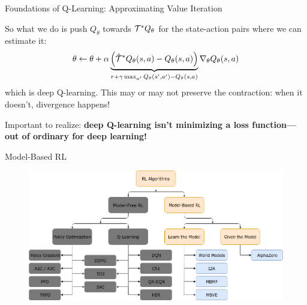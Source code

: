 \documentclass[9pt]{beamer}
\begin{document}
\begin{frame}{Foundations of Q-Learning: Approximating Value Iteration}

So what we do is push $Q_{\theta}$ towards ${\mathcal T}^* Q_{\theta}$ for the state-action pairs where we can estimate it:
%
\begin{equation*}
\theta \leftarrow \theta + \alpha \underbrace{\left(\hat{{\mathcal T}}^*Q_{\theta}(s,a) - Q_{\theta}(s,a)\right)}_{r + \gamma \max_{a'} Q_{\theta}(s',a') - Q_{\theta}(s,a)} \nabla_{\theta} Q_{\theta}(s,a)
\end{equation*}
%
which is deep Q-learning. This may or may not preserve the contraction: when it doesn't, divergence happens!

\vspace{2em}

Important to realize: \textbf{deep Q-learning isn't minimizing a loss function---out of ordinary for deep learning!}

\end{frame}

\begin{frame}{Model-Based RL}
\begin{figure}
\centering
\includegraphics[width=\linewidth]{rl_algorithms_modelbased_only}
\end{figure}
\end{frame}
\end{document}
